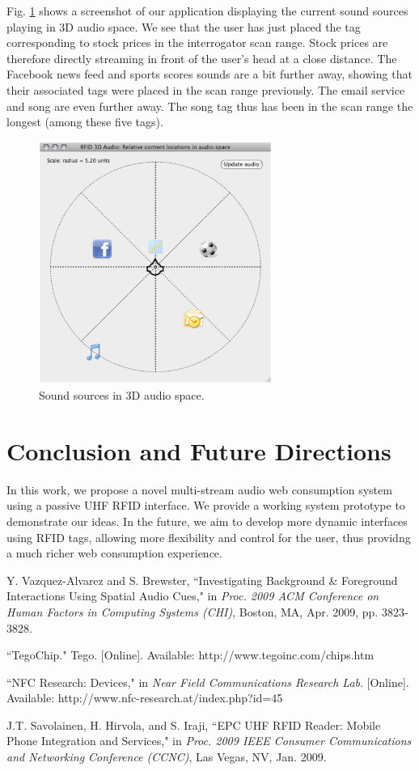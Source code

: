 \documentclass[conference]{IEEEtran}
\begin{document}
Fig. \ref{figure} shows a screenshot of our application displaying the current sound sources playing in 3D audio space.  We see that the user has just placed the tag corresponding to stock prices in the interrogator scan range.  Stock prices are therefore directly streaming in front of the user's head at a close distance.  The Facebook news feed and sports scores sounds are a bit further away, showing that their associated tags were placed in the scan range previously.  The email service and song are even further away.  The song tag thus has been in the scan range the longest (among these five tags).  
\begin{figure}
\centering
\includegraphics[clip=true, viewport=0 100 600 700, width=3in]{program.eps}
\caption{Sound sources in 3D audio space.\label{figure}}
\end{figure}

\section{Conclusion and Future Directions}
In this work, we propose a novel multi-stream audio web consumption system using a passive UHF RFID interface.  We provide a working system prototype to demonstrate our ideas.  In the future, we aim to develop more dynamic interfaces using RFID tags, allowing more flexibility and control for the user, thus providng a much richer web consumption experience.

\begin{thebibliography}{1}

Y. Vazquez-Alvarez and S. Brewster, ``Investigating Background \& Foreground Interactions Using Spatial Audio Cues," in \emph{Proc. 2009 ACM Conference on Human Factors in Computing Systems (CHI)}, Boston, MA, Apr. 2009, pp. 3823-3828.

``TegoChip." Tego. [Online]. Available: http://www.tegoinc.com/chips.htm 

``NFC Research: Devices," in \emph{Near Field Communications Research Lab}.  [Online].  Available: http://www.nfc-research.at/index.php?id=45

J.T. Savolainen, H. Hirvola, and S. Iraji, ``EPC UHF RFID Reader: Mobile Phone Integration and Services," in \emph{Proc. 2009 IEEE Consumer Communications and Networking Conference (CCNC)}, Las Vegas, NV, Jan. 2009.


\end{thebibliography}
\end{document}
